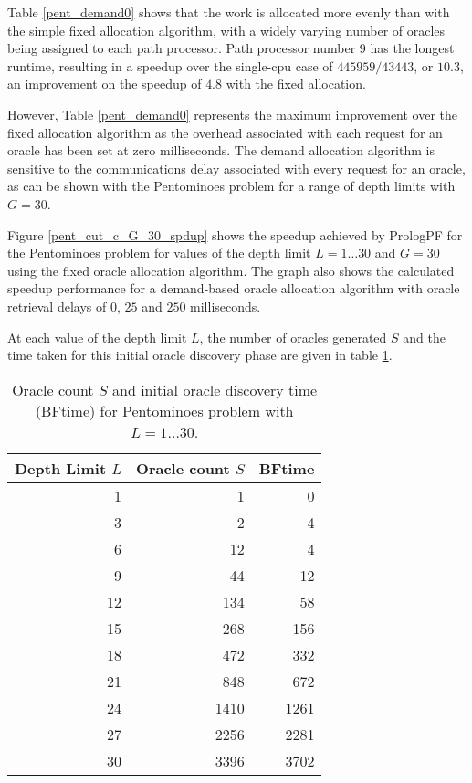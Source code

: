 Table \ref{pent_demand0} shows that the work is allocated more evenly than with the simple
fixed allocation algorithm,  with a widely varying number of oracles being assigned to
each path processor.  Path processor number 9 has the longest runtime, resulting in a
speedup over the single-cpu case of $445959/43443$, or $10.3$, an improvement on the speedup of
$4.8$ with the fixed allocation.

However, Table \ref{pent_demand0} represents the maximum improvement over the fixed allocation
algorithm as the overhead associated with each request for an oracle has been set at zero
milliseconds.  The demand allocation algorithm is sensitive to the communications delay
associated with every request for an oracle, as can be shown with the Pentominoes problem for
a range of depth limits with $G=30$.

Figure \ref{pent_cut_c_G_30_spdup} shows the speedup achieved by PrologPF for the Pentominoes
problem for values of the depth limit $L=1\ldots 30$ and $G=30$ using the fixed oracle allocation
algorithm.  The graph also shows the calculated speedup performance for a demand-based
oracle allocation algorithm with oracle retrieval delays of $0$, $25$ and $250$
milliseconds.

At each value of the depth limit $L$, the number of oracles generated $S$ and the time
taken for this initial oracle discovery phase are given in table \ref{pent_L_S_BFtime}.

\begin{table}[htbp]
{\small
\begin{tabular}{| r | r | r |}
\hline
\textbf{Depth Limit $L$} & \textbf{Oracle count $S$} & \textbf{BFtime} \\
\hline
1  &    1 & 0 \\
3  &    2 & 4 \\
6  &   12 & 4 \\
9  &   44 & 12 \\
12 &  134 & 58 \\
15 &  268 & 156 \\
18 &  472 & 332 \\
21 &  848 & 672 \\
24 & 1410 & 1261 \\
27 & 2256 & 2281 \\
30 & 3396 & 3702 \\
\hline
\end{tabular}
}
\caption{Oracle count $S$ and initial oracle discovery time (BFtime) for Pentominoes
  problem with $L=1\ldots 30$.}
\label{pent_L_S_BFtime}
\end{table}

